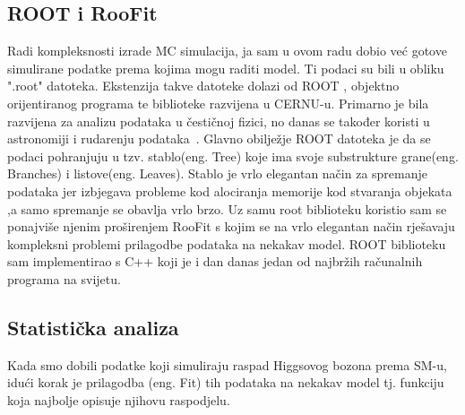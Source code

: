\documentclass[12pt,a4paper,oneside]{article}
\begin{document}
\begin{linenumbers}
		\subsection{ROOT i RooFit}
		Radi kompleksnosti izrade MC simulacija, ja sam u ovom radu dobio već gotove simulirane podatke prema kojima mogu raditi model. Ti podaci su bili u obliku ".root" datoteka. Ekstenzija takve datoteke dolazi od ROOT , objektno orijentiranog programa te biblioteke razvijena u CERNU-u. Primarno je bila razvijena za analizu podataka u čestičnoj fizici, no danas se također koristi u astronomiji i rudarenju podataka~\cite{roofit}. Glavno obilježje ROOT datoteka je da se podaci pohranjuju u tzv. stablo(eng. Tree) koje ima svoje substrukture grane(eng. Branches) i listove(eng. Leaves).  Stablo je vrlo elegantan način za spremanje podataka jer izbjegava probleme kod alociranja memorije kod stvaranja objekata ,a samo spremanje se obavlja vrlo brzo. Uz samu root biblioteku koristio sam se ponajviše njenim proširenjem RooFit s kojim se na vrlo elegantan način rješavaju kompleksni problemi prilagodbe podataka na nekakav model. ROOT biblioteku sam implementirao s C++ koji je i dan danas jedan od najbržih računalnih programa na svijetu.
		
		\subsection{Statistička analiza}
		Kada smo dobili podatke koji simuliraju raspad Higgsovog bozona prema SM-u, idući korak je prilagodba (eng. Fit) tih podataka na nekakav model tj. funkciju koja najbolje opisuje njihovu raspodjelu.
		

\end{linenumbers}
\end{document}
